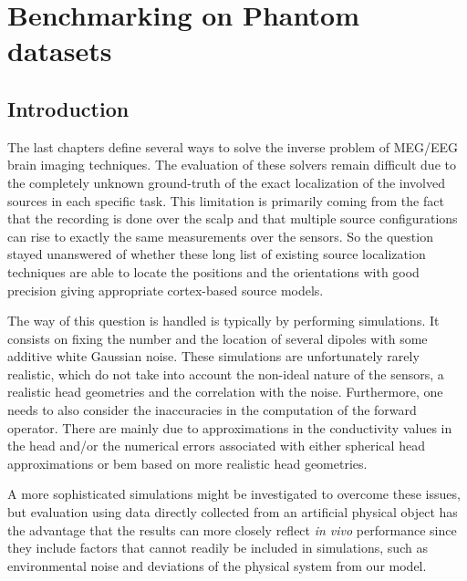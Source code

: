 
\chapter{Benchmarking on Phantom datasets}
\label{chapter:benchmark}
\noindent\makebox[\linewidth]{\rule{0.75\paperwidth}{0.4pt}}
\noindent\makebox[\linewidth]{\rule{0.75\paperwidth}{0.4pt}}

\localtableofcontents %

\noindent\makebox[\linewidth]{\rule{0.75\paperwidth}{0.4pt}}
\noindent\makebox[\linewidth]{\rule{0.75\paperwidth}{0.4pt}}
\newpage

\section{Introduction}
The last chapters define several ways to solve the inverse problem of MEG/EEG brain imaging techniques. The evaluation of these solvers remain difficult due to the completely unknown ground-truth of the exact localization of the involved sources in each specific task. This limitation is primarily coming from the fact that the recording is done over the scalp and that multiple source configurations can rise to exactly the same measurements over the sensors. So the question stayed unanswered of whether these long list of existing source localization techniques are able to locate the positions and the orientations with good precision giving appropriate cortex-based source models.

The way of this question is handled is typically by performing simulations. It consists on fixing the number and the location of several dipoles with some additive white Gaussian noise. These simulations are unfortunately rarely realistic, which do not take into account the non-ideal nature of the sensors, a realistic head geometries and the correlation with the noise. Furthermore, one needs to also consider the inaccuracies in the computation of the forward operator. There are mainly due to approximations in the conductivity values in the head and/or the numerical errors associated with either spherical head approximations or \ac{bem} based on more realistic head geometries. 

A more sophisticated simulations might be investigated to overcome these issues, but evaluation using data directly collected from an artificial physical object has the advantage that the results can more closely reflect \textit{in vivo} performance since they include factors that cannot readily be included in simulations, such as environmental noise and deviations of the physical system from our model. 

